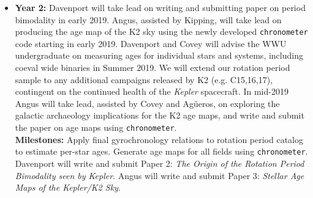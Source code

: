 \documentclass[12pt]{article}
\newcommand{\Kepler}{\textsl{Kepler}\xspace}
\begin{document}
\begin{itemize}
%
\item {\bf Year 2:} Davenport will take lead on writing and submitting paper on period bimodality in early 2019. 
Angus, assisted by Kipping, will take lead on producing the age map of the K2 sky using the newly developed {\tt chronometer} code starting in early 2019. 
Davenport and Covey will advise the WWU undergraduate on measuring ages for individual stars and systems, including coeval wide binaries in Summer 2019. 
We will extend our rotation period sample to any additional campaigns released by K2 (e.g. C15,16,17), contingent on the continued health of the \Kepler spacecraft.
In mid-2019 Angus will take lead, assisted by Covey and Ag\"{u}eros, on exploring the galactic archaeology implications for the K2 age maps, and write and submit the paper on age maps using {\tt chronometer}.
\\
{\bf Milestones:} Apply final gyrochronology relations to rotation period catalog to estimate per-star ages. Generate age maps for all fields using {\tt chronometer}. Davenport will write and submit Paper 2: {\it The Origin of the Rotation Period Bimodality seen by \Kepler}. Angus will write and submit Paper 3: {\it Stellar Age Maps of the \Kepler/K2 Sky}.
\end{itemize}



\clearpage


\end{document}
